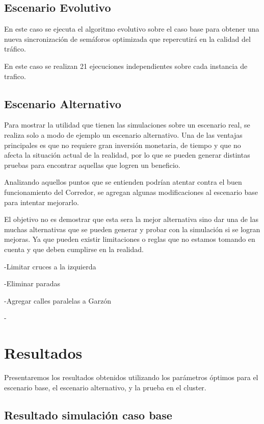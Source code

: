 \subsection{Escenario Evolutivo }
En este caso se ejecuta el algoritmo evolutivo sobre el caso base para obtener una nueva sincronización de semáforos optimizada que repercutirá en la calidad del tráfico.

En este caso se realizan 21 ejecuciones independientes sobre cada instancia de trafico.


\subsection{Escenario Alternativo}

Para mostrar la utilidad que tienen las simulaciones sobre un escenario real, se realiza solo a modo de ejemplo un escenario alternativo. Una de las ventajas principales es que no requiere gran inversión monetaria, de tiempo y que no afecta la situación actual de la realidad, por lo que se pueden generar distintas pruebas para encontrar aquellas que logren un beneficio.

Analizando aquellos puntos que se entienden podrían atentar contra el buen funcionamiento del Corredor, se agregan algunas modificaciones al escenario base para intentar mejorarlo. 

El objetivo no es demostrar que esta sera la mejor alternativa sino dar una de las muchas alternativas que se pueden generar y probar con la simulación si se logran mejoras. Ya que pueden existir limitaciones o reglas que no estamos tomando en cuenta y que deben cumplirse en la realidad.

-Limitar cruces a la izquierda

-Eliminar paradas

-Agregar calles paralelas a Garzón

-


\section{Resultados}
Presentaremos los resultados obtenidos  utilizando los parámetros óptimos  para el escenario base, el escenario alternativo, y la prueba en el cluster.

\subsection{Resultado simulación caso base}


